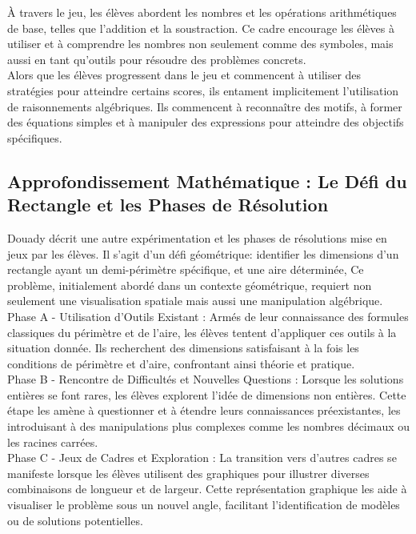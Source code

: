 À travers le jeu,
les élèves abordent les nombres et les opérations arithmétiques de base,
telles que l'addition et la soustraction.
Ce cadre encourage les élèves à utiliser et à comprendre les nombres non seulement comme des symboles,
mais aussi en tant qu'outils pour résoudre des problèmes concrets.\\

Alors que les élèves progressent dans le jeu et commencent à utiliser des stratégies pour atteindre certains scores,
ils entament implicitement l'utilisation de raisonnements algébriques.
Ils commencent à reconnaître des motifs,
à former des équations simples et à manipuler des expressions pour atteindre des objectifs spécifiques.

\subsection{Approfondissement Mathématique : Le Défi du Rectangle et les Phases de Résolution}

Douady décrit une autre expérimentation et les phases de résolutions mise en jeux par les élèves.
Il s'agit d'un défi géométrique:
identifier les dimensions d'un rectangle ayant un demi-périmètre spécifique,
et une aire déterminée,
Ce problème,
initialement abordé dans un contexte géométrique,
requiert non seulement une visualisation spatiale mais aussi une manipulation algébrique.\\

Phase A - Utilisation d'Outils Existant :
Armés de leur connaissance des formules classiques du périmètre et de l'aire,
les élèves tentent d'appliquer ces outils à la situation donnée.
Ils recherchent des dimensions satisfaisant à la fois les conditions de périmètre et d'aire,
confrontant ainsi théorie et pratique.\\

Phase B - Rencontre de Difficultés et Nouvelles Questions :
Lorsque les solutions entières se font rares,
les élèves explorent l'idée de dimensions non entières.
Cette étape les amène à questionner et à étendre leurs connaissances préexistantes,
les introduisant à des manipulations plus complexes comme les nombres décimaux ou les racines carrées.\\

Phase C - Jeux de Cadres et Exploration :
La transition vers d'autres cadres se manifeste lorsque les élèves utilisent des graphiques pour illustrer diverses combinaisons de longueur et de largeur.
Cette représentation graphique les aide à visualiser le problème sous un nouvel angle,
facilitant l'identification de modèles ou de solutions potentielles.\\

